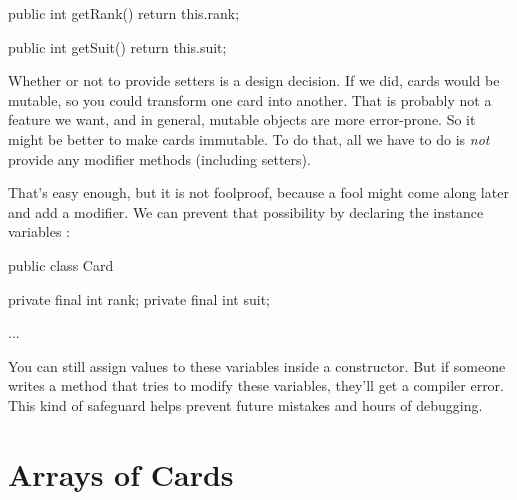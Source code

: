 \begin{code}
public int getRank() {
    return this.rank;
}

public int getSuit() {
    return this.suit;
}
\end{code}


Whether or not to provide setters is a design decision.
If we did, cards would be mutable, so you could transform one card into another.
That is probably not a feature we want, and in general, mutable objects are more error-prone.
So it might be better to make cards immutable.
To do that, all we have to do is {\em not} provide any modifier methods (including setters).


That's easy enough, but it is not foolproof, because a fool might come along later and add a modifier.
We can prevent that possibility by declaring the instance variables :

\begin{code}
public class Card {
    private final int rank;
    private final int suit;

    ...
}
\end{code}

You can still assign values to these variables inside a constructor.
But if someone writes a method that tries to modify these variables, they'll get a compiler error.
This kind of safeguard helps prevent future mistakes and hours of debugging.


\section{Arrays of Cards}
\label{cardarray}




